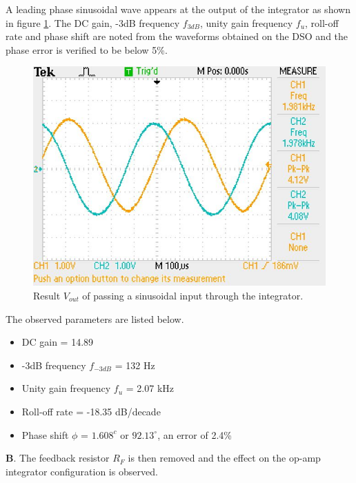 \documentclass[12pt, titlepage]{article}
\theoremstyle{definition}
\begin{document}
    A leading phase sinusoidal wave appears at the output of the integrator as shown in figure \ref{fig:results_q1}.
    The DC gain, -3dB frequency $f_{3dB}$, unity gain frequency $f_u$, roll-off rate and phase shift are noted from the waveforms obtained on the DSO and the phase error is verified to be below 5\%.

    \begin{figure}[h]
      \centering
      \includegraphics[scale=0.5]{images/results_q1.jpeg}
      \caption{Result \color{cyan}$V_{out}$ \color{black}of passing a sinusoidal input  \color{black}through the integrator.}
      \label{fig:results_q1}
    \end{figure}

    The observed parameters are listed below.
    \begin{itemize}
      \item[] DC gain = 14.89
      \item[] -3dB frequency $f_{-3dB}$ = 132 Hz
      \item[] Unity gain frequency $f_u$ = 2.07 kHz
      \item[] Roll-off rate = -18.35 dB/decade
      \item[] Phase shift $\phi$ = $1.608^{c}$ or $92.13^{\circ}$, an error of 2.4\%
    \end{itemize}

    \newpage
    \textbf{B}. The feedback resistor $R_F$ is then removed and the effect on the op-amp integrator configuration is observed.
\end{document}
